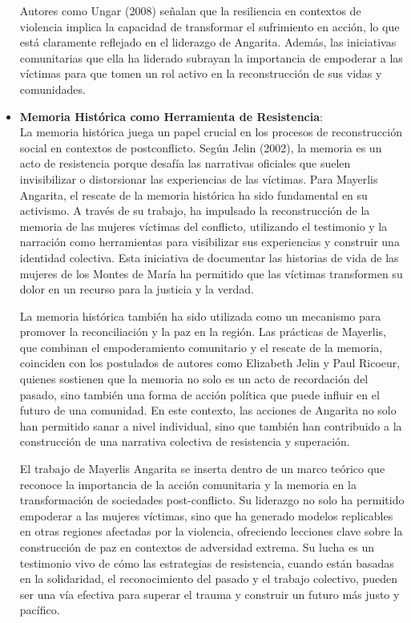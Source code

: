 \documentclass[letterpaper, 12pt]{article}
\begin{document}
\begin{itemize}[label=$\bullet$]
            Autores como Ungar (2008) señalan que la resiliencia en contextos de violencia
            implica la capacidad de transformar el sufrimiento en acción, lo que está
            claramente reflejado en el liderazgo de Angarita. Además, las iniciativas
            comunitarias que ella ha liderado subrayan la importancia de empoderar a las
            víctimas para que tomen un rol activo en la reconstrucción de sus vidas y
            comunidades.
      \item \textbf{Memoria Histórica como Herramienta de Resistencia}: \\
            La memoria histórica juega un papel crucial en los procesos de reconstrucción
            social en contextos de postconflicto. Según Jelin (2002), la memoria es un acto
            de resistencia porque desafía las narrativas oficiales que suelen invisibilizar
            o distorsionar las experiencias de las víctimas. Para Mayerlis Angarita, el
            rescate de la memoria histórica ha sido fundamental en su activismo. A través
            de su trabajo, ha impulsado la reconstrucción de la memoria de las mujeres
            víctimas del conflicto, utilizando el testimonio y la narración como
            herramientas para visibilizar sus experiencias y construir una identidad
            colectiva. Esta iniciativa de documentar las historias de vida de las mujeres
            de los Montes de María ha permitido que las víctimas transformen su dolor en un
            recurso para la justicia y la verdad.

            La memoria histórica también ha sido utilizada como un mecanismo para promover
            la reconciliación y la paz en la región. Las prácticas de Mayerlis, que
            combinan el empoderamiento comunitario y el rescate de la memoria, coinciden
            con los postulados de autores como Elizabeth Jelin y Paul Ricoeur, quienes
            sostienen que la memoria no solo es un acto de recordación del pasado, sino
            también una forma de acción política que puede influir en el futuro de una
            comunidad. En este contexto, las acciones de Angarita no solo han permitido
            sanar a nivel individual, sino que también han contribuido a la construcción de
            una narrativa colectiva de resistencia y superación.

            El trabajo de Mayerlis Angarita se inserta dentro de un marco teórico que
            reconoce la importancia de la acción comunitaria y la memoria en la
            transformación de sociedades post-conflicto. Su liderazgo no solo ha permitido
            empoderar a las mujeres víctimas, sino que ha generado modelos replicables en
            otras regiones afectadas por la violencia, ofreciendo lecciones clave sobre la
            construcción de paz en contextos de adversidad extrema. Su lucha es un
            testimonio vivo de cómo las estrategias de resistencia, cuando están basadas en
            la solidaridad, el reconocimiento del pasado y el trabajo colectivo, pueden ser
            una vía efectiva para superar el trauma y construir un futuro más justo y
            pacífico.
\end{itemize}
\end{document}
